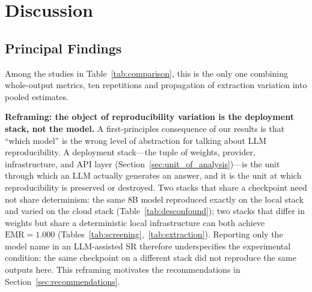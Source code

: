 \documentclass[preprint,review,12pt,authoryear]{elsarticle}
\newcommand{\emr}{\textrm{EMR}}
\begin{document}
\section{Discussion}

\subsection{Principal Findings}

Among the studies in Table~\ref{tab:comparison}, this is the only one combining whole-output metrics, ten repetitions and propagation of extraction variation into pooled estimates.

\textbf{Reframing: the object of reproducibility variation is the deployment stack, not the model.}
A first-principles consequence of our results is that ``which model'' is the wrong level of abstraction for talking about LLM reproducibility.
A deployment stack---the tuple of weights, provider, infrastructure, and API layer (Section~\ref{sec:unit_of_analysis})---is the unit through which an LLM actually generates an answer, and it is the unit at which reproducibility is preserved or destroyed.
Two stacks that share a checkpoint need not share determinism: the same 8B model reproduced exactly on the local stack and varied on the cloud stack (Table~\ref{tab:desconfound}); two stacks that differ in weights but share a deterministic local infrastructure can both achieve $\emr{=}1.000$ (Tables~\ref{tab:screening},~\ref{tab:extraction}).
Reporting only the model name in an LLM-assisted SR therefore underspecifies the experimental condition: the same checkpoint on a different stack did not reproduce the same outputs here.
This reframing motivates the recommendations in Section~\ref{sec:recommendations}.
\end{document}
